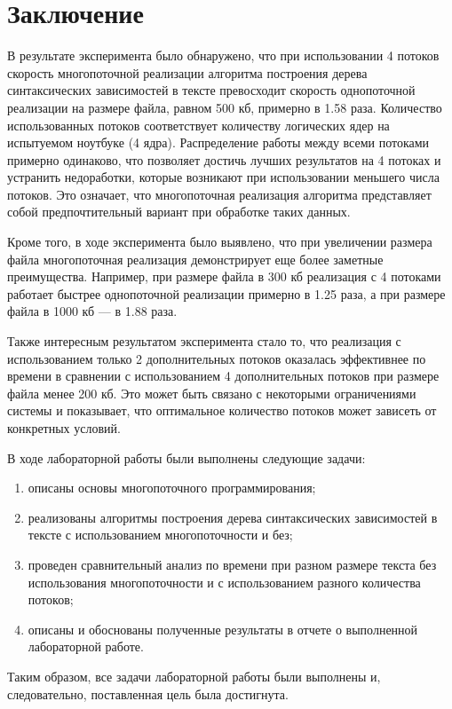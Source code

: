\chapter*{Заключение}

В результате эксперимента было обнаружено, что при использовании 4 потоков скорость многопоточной реализации алгоритма построения дерева синтаксических зависимостей в тексте превосходит скорость однопоточной реализации на размере файла, равном 500 кб, примерно в 1.58 раза. Количество использованных потоков соответствует количеству логических ядер на испытуемом ноутбуке (4 ядра). Распределение работы между всеми потоками примерно одинаково, что позволяет достичь лучших результатов на 4 потоках и устранить недоработки, которые возникают при использовании меньшего числа потоков. Это означает, что многопоточная реализация алгоритма представляет собой предпочтительный вариант при обработке таких данных.

Кроме того, в ходе эксперимента было выявлено, что при увеличении размера файла многопоточная реализация демонстрирует еще более заметные преимущества. Например, при размере файла в 300 кб реализация с 4 потоками работает быстрее однопоточной реализации примерно в 1.25 раза, а при размере файла в 1000 кб --- в 1.88 раза.

Также интересным результатом эксперимента стало то, что реализация с использованием только 2 дополнительных потоков оказалась эффективнее по времени в сравнении с использованием 4 дополнительных потоков при размере файла менее 200 кб. Это может быть связано с некоторыми ограничениями системы и показывает, что оптимальное количество потоков может зависеть от конкретных условий.

В ходе лабораторной работы были выполнены следующие задачи:
\begin{enumerate}[label=\arabic*)]
	\item описаны основы многопоточного программирования;
	\item реализованы алгоритмы построения дерева синтаксических зависимостей в тексте с использованием многопоточности и без;
	\item проведен сравнительный анализ по времени при разном размере текста без использования многопоточности и с использованием разного количества потоков;
	\item описаны и обоснованы полученные результаты в отчете о выполненной лабораторной работе.
\end{enumerate} 


Таким образом, все задачи лабораторной работы были выполнены и, следовательно, поставленная цель была достигнута.